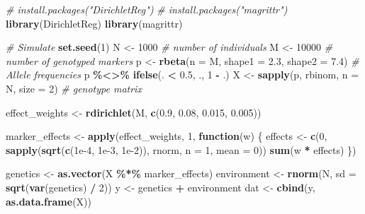 \documentclass[
]{article}
\newenvironment{Shaded}{\begin{snugshade}}{\end{snugshade}}
\newcommand{\AttributeTok}[1]{\textcolor[rgb]{0.13,0.29,0.53}{#1}}
\newcommand{\CommentTok}[1]{\textcolor[rgb]{0.56,0.35,0.01}{\textit{#1}}}
\newcommand{\ControlFlowTok}[1]{\textcolor[rgb]{0.13,0.29,0.53}{\textbf{#1}}}
\newcommand{\DecValTok}[1]{\textcolor[rgb]{0.00,0.00,0.81}{#1}}
\newcommand{\FloatTok}[1]{\textcolor[rgb]{0.00,0.00,0.81}{#1}}
\newcommand{\FunctionTok}[1]{\textcolor[rgb]{0.13,0.29,0.53}{\textbf{#1}}}
\newcommand{\NormalTok}[1]{#1}
\newcommand{\OtherTok}[1]{\textcolor[rgb]{0.56,0.35,0.01}{#1}}
\newcommand{\SpecialCharTok}[1]{\textcolor[rgb]{0.81,0.36,0.00}{\textbf{#1}}}
\begin{document}
\begin{Shaded}
\begin{Highlighting}[]
\CommentTok{\# install.packages("DirichletReg")}
\CommentTok{\# install.packages("magrittr")}
\FunctionTok{library}\NormalTok{(DirichletReg)}
\FunctionTok{library}\NormalTok{(magrittr)}

\CommentTok{\# Simulate }
\FunctionTok{set.seed}\NormalTok{(}\DecValTok{1}\NormalTok{)}
\NormalTok{N }\OtherTok{\textless{}{-}} \DecValTok{1000} \CommentTok{\# number of individuals}
\NormalTok{M }\OtherTok{\textless{}{-}} \DecValTok{10000} \CommentTok{\# number of genotyped markers}
\NormalTok{p }\OtherTok{\textless{}{-}} \FunctionTok{rbeta}\NormalTok{(}\AttributeTok{n =}\NormalTok{ M, }\AttributeTok{shape1 =} \FloatTok{2.3}\NormalTok{, }\AttributeTok{shape2 =} \FloatTok{7.4}\NormalTok{) }\CommentTok{\# Allele frequencies}
\NormalTok{p }\SpecialCharTok{\%\textless{}\textgreater{}\%} \FunctionTok{ifelse}\NormalTok{(. }\SpecialCharTok{\textless{}} \FloatTok{0.5}\NormalTok{, ., }\DecValTok{1} \SpecialCharTok{{-}}\NormalTok{ .)}
\NormalTok{X }\OtherTok{\textless{}{-}} \FunctionTok{sapply}\NormalTok{(p, rbinom, }\AttributeTok{n =}\NormalTok{ N, }\AttributeTok{size =} \DecValTok{2}\NormalTok{) }\CommentTok{\# genotype matrix}

\NormalTok{effect\_weights }\OtherTok{\textless{}{-}} \FunctionTok{rdirichlet}\NormalTok{(M, }\FunctionTok{c}\NormalTok{(}\FloatTok{0.9}\NormalTok{, }\FloatTok{0.08}\NormalTok{, }\FloatTok{0.015}\NormalTok{, }\FloatTok{0.005}\NormalTok{))}

\NormalTok{marker\_effects }\OtherTok{\textless{}{-}} \FunctionTok{apply}\NormalTok{(effect\_weights, }\DecValTok{1}\NormalTok{, }\ControlFlowTok{function}\NormalTok{(w) \{}
\NormalTok{  effects }\OtherTok{\textless{}{-}} \FunctionTok{c}\NormalTok{(}\DecValTok{0}\NormalTok{, }\FunctionTok{sapply}\NormalTok{(}\FunctionTok{sqrt}\NormalTok{(}\FunctionTok{c}\NormalTok{(}\FloatTok{1e{-}4}\NormalTok{, }\FloatTok{1e{-}3}\NormalTok{, }\FloatTok{1e{-}2}\NormalTok{)), rnorm, }\AttributeTok{n =} \DecValTok{1}\NormalTok{, }\AttributeTok{mean =} \DecValTok{0}\NormalTok{))}
  \FunctionTok{sum}\NormalTok{(w }\SpecialCharTok{*}\NormalTok{ effects)}
\NormalTok{\})}

\NormalTok{genetics }\OtherTok{\textless{}{-}} \FunctionTok{as.vector}\NormalTok{(X }\SpecialCharTok{\%*\%}\NormalTok{ marker\_effects)}
\NormalTok{environment }\OtherTok{\textless{}{-}} \FunctionTok{rnorm}\NormalTok{(N, }\AttributeTok{sd =} \FunctionTok{sqrt}\NormalTok{(}\FunctionTok{var}\NormalTok{(genetics) }\SpecialCharTok{/} \DecValTok{2}\NormalTok{))}
\NormalTok{y }\OtherTok{\textless{}{-}}\NormalTok{ genetics }\SpecialCharTok{+}\NormalTok{ environment}
\NormalTok{dat }\OtherTok{\textless{}{-}} \FunctionTok{cbind}\NormalTok{(y, }\FunctionTok{as.data.frame}\NormalTok{(X))}
\end{Highlighting}
\end{Shaded}
\end{document}
